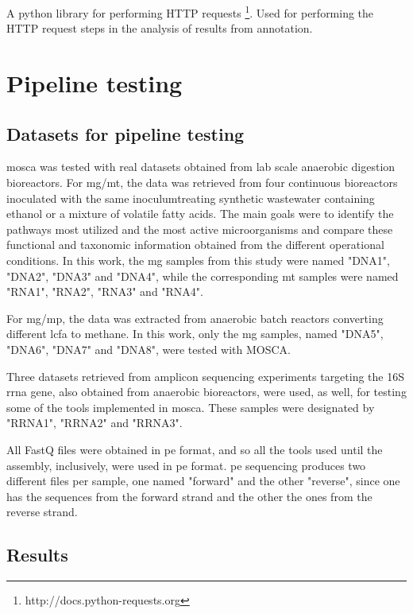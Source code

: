 \documentclass[
  oneside,
  11pt, a4paper,
  footinclude=true,
  headinclude=true,
  cleardoublepage=empty
]{scrbook}
\begin{document}
    A python library for performing HTTP requests \footnote{http://docs.python-requests.org}. Used for performing the HTTP request steps in the analysis of results from annotation.
    
    \chapter{Pipeline testing}
    
    \section{Datasets for pipeline testing}
	
	\gls{mosca} was tested with real datasets obtained from lab scale anaerobic digestion bioreactors. For \gls{mg}/\gls{mt}, the data was retrieved from four continuous bioreactors inoculated with the same inoculumtreating synthetic wastewater containing ethanol or a mixture of volatile fatty acids. The main goals were to identify the pathways most utilized and the most active microorganisms and compare these functional and taxonomic information obtained from the different operational conditions. In this work, the \gls{mg} samples from this study were named "DNA1", "DNA2", "DNA3" and "DNA4", while the corresponding \gls{mt} samples were named "RNA1", "RNA2", "RNA3" and "RNA4".

	For \gls{mg}/\gls{mp}, the data was extracted from anaerobic batch reactors converting different \gls{lcfa} to methane. In this work, only the \gls{mg} samples, named "DNA5", "DNA6", "DNA7" and "DNA8", were tested with MOSCA. 

	Three datasets retrieved from amplicon sequencing experiments targeting the 16S \gls{rrna} gene, also obtained from anaerobic bioreactors, were used, as well, for testing some of the tools implemented in \gls{mosca}. These samples were designated by "RRNA1", "RRNA2" and "RRNA3".
	
	All FastQ files were obtained in \gls{pe} format, and so all the tools used until the assembly, inclusively, were used in \gls{pe} format. \gls{pe} sequencing produces two different files per sample, one named "forward" and the other "reverse", since one has the sequences from the forward strand and the other the ones from the reverse strand.
	
	\section{Results}
    
\end{document}

